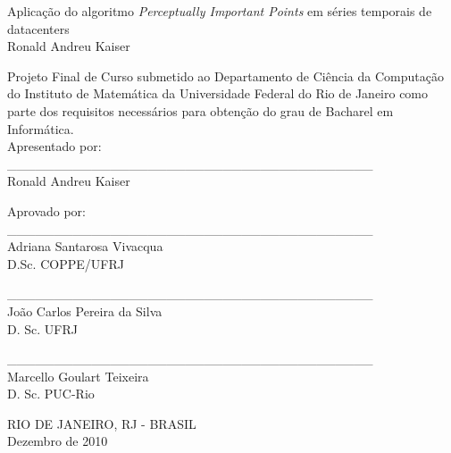 \begin{titlepage}
  \begin{center}
    \large
    Aplicação do algoritmo \textit{Perceptually Important Points} em séries temporais de datacenters\\
    \vspace{1cm}
    \normalsize
    Ronald Andreu Kaiser \\
  \end{center}
\flushleft
Projeto Final de Curso submetido ao Departamento de Ciência da Computação do Instituto de Matemática da Universidade Federal do Rio de Janeiro como parte dos requisitos necessários para obtenção do grau de Bacharel em Informática. \\

\vspace{1cm}
Apresentado por: \\
\flushright
\_\_\_\_\_\_\_\_\_\_\_\_\_\_\_\_\_\_\_\_\_\_\_\_\_\_\_\_\_\_\_\_\_\_\_\_\_\_\_\\
Ronald Andreu Kaiser

\vspace{1cm}
\flushleft
Aprovado por: \\
\flushright
\_\_\_\_\_\_\_\_\_\_\_\_\_\_\_\_\_\_\_\_\_\_\_\_\_\_\_\_\_\_\_\_\_\_\_\_\_\_\_\\
Adriana Santarosa Vivacqua\\
D.Sc. COPPE/UFRJ

\vspace{1cm}
\_\_\_\_\_\_\_\_\_\_\_\_\_\_\_\_\_\_\_\_\_\_\_\_\_\_\_\_\_\_\_\_\_\_\_\_\_\_\_\\
João Carlos Pereira da Silva \\
D. Sc. UFRJ

\vspace{1cm}
\_\_\_\_\_\_\_\_\_\_\_\_\_\_\_\_\_\_\_\_\_\_\_\_\_\_\_\_\_\_\_\_\_\_\_\_\_\_\_\\
Marcello Goulart Teixeira \\
D. Sc. PUC-Rio

\vfill

\begin{center}
RIO DE JANEIRO, RJ - BRASIL\\
Dezembro de 2010
\end{center}

\vspace{2cm}
\end{titlepage}
